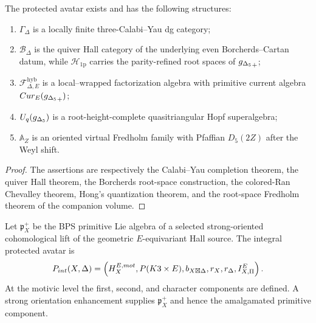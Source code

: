 \begin{theorem}
The protected avatar exists and has the following structures:
\begin{enumerate}
\item $\Gamma_\Delta$ is a locally finite three-Calabi--Yau dg category;
\item $\mathcal B_\Delta$ is the quiver Hall category of the underlying even Borcherds--Cartan datum, while $\mathcal H_{\mathrm{1p}}$ carries the parity-refined root spaces of ${g_{\Delta_5}}_+$;
\item $\mathcal F^{\mathrm{hyb}}_{\Delta,E}$ is a local--wrapped factorization algebra with primitive current algebra $Cur_E({g_{\Delta_5}}_+)$;
\item $U_q({g_{\Delta_5}})$ is a root-height-complete quasitriangular Hopf superalgebra;
\item $\mathbb A_Z$ is an oriented virtual Fredholm family with Pfaffian $D_5(2Z)$ after the Weyl shift.
\end{enumerate}
\end{theorem}
\begin{proof}
The assertions are respectively the Calabi--Yau completion theorem, the quiver Hall theorem, the Borcherds root-space construction, the colored-Ran Chevalley theorem, Hong's quantization theorem, and the root-space Fredholm theorem of the companion volume.
\end{proof}

\begin{definition}
Let $\mathfrak p_X^+$ be the BPS primitive Lie algebra of a selected strong-oriented cohomological lift of the geometric $E$-equivariant Hall source.  The integral protected avatar is
\[
 P_{int}(X,\Delta)
 =\left(
   H_X^{E,mot},
   P(K3\times E),
   b_{X\boxtimes\Delta},
   r_X,r_\Delta,
   I_{X,\Pi}^E
 \right).
\]
At the motivic level the first, second, and character components are defined.  A strong orientation enhancement supplies $\mathfrak p_X^+$ and hence the amalgamated primitive component.
\end{definition}

